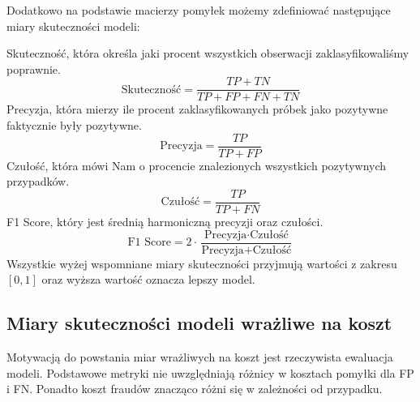 \documentclass{book}
\begin{document}
Dodatkowo na podstawie macierzy pomyłek możemy zdefiniować następujące miary skuteczności modeli:

Skuteczność, która określa jaki procent wszystkich obserwacji zaklasyfikowaliśmy poprawnie.
$$ \text{Skuteczność} = \frac{TP + TN}{TP + FP + FN + TN} $$
Precyzja, która mierzy ile procent zaklasyfikowanych próbek jako pozytywne faktycznie były pozytywne.
$$ \text{Precyzja} = \frac{TP}{TP + FP} $$
Czułość, która mówi Nam o procencie znalezionych wszystkich pozytywnych przypadków.
$$ \text{Czułość}= \frac{TP}{TP + FN} $$
F1 Score, który jest średnią harmoniczną precyzji oraz czułości.
$$ \text{F1 Score} = 2 \cdot \frac{\text{Precyzja} \cdot \text{Czułość}}{\text{Precyzja} + \text{Czułość}} $$
Wszystkie wyżej wspomniane miary skuteczności przyjmują wartości z zakresu $[0,1]$ oraz wyższa wartość oznacza lepszy model.


\subsection{Miary skuteczności modeli wrażliwe na koszt}

	Motywacją do powstania miar wrażliwych na koszt jest rzeczywista ewaluacja modeli. Podstawowe metryki nie uwzględniają różnicy w kosztach pomyłki dla FP i FN. Ponadto koszt fraudów znacząco różni się w zależności od przypadku.
\end{document}
